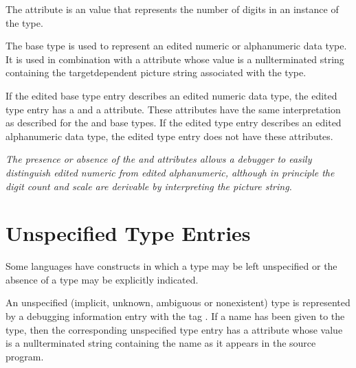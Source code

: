 The \DWATdigitcountDEFN{} attribute 
\hypertarget{chap:DWATdigitcountdigitcountforpackeddecimalornumericstringtype}{}
is an 
value that represents the number of digits in an instance of
the type.

The \DWATEedited{} base 
\hypertarget{chap:DWATpicturestringpicturestringfornumericstringtype}{}
type is used to represent an edited
numeric or alphanumeric data type. It is used in combination
with a \DWATpicturestringDEFN{} attribute whose value is a 
null\dash terminated string containing the target\dash dependent picture
string associated with the type.

If the edited base type entry describes an edited numeric
data type, the edited type entry has a \DWATdigitcount{} and a
\DWATdecimalscale{} attribute.
These attributes have the same
interpretation as described for the 
\DWATEpackeddecimal{} and
\DWATEnumericstring{} base 
types. If the edited type entry
describes an edited alphanumeric data type, the edited type
entry does not have these attributes.

\textit{The presence or absence of the \DWATdigitcount{} and
\DWATdecimalscale{} attributes
allows a debugger to easily
distinguish edited numeric from edited alphanumeric, although
in principle the digit count and scale are derivable by
interpreting the picture string.}


\section{Unspecified Type Entries}
\label{chap:unspecifiedtypeentries}
Some languages have constructs in which a type 
may be left unspecified or the absence of a type
may be explicitly indicated.

An unspecified (implicit, unknown, ambiguous or nonexistent)
type is represented by a debugging information entry with
the tag \DWTAGunspecifiedtypeTARG. 
If a name has been given
to the type, then the corresponding unspecified type entry
has a \DWATname{} attribute 
whose value is
a null\dash terminated
string containing the name as it appears in the source program.

